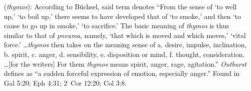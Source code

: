 \item[Outburst,]

(\textit{thymos}):
According to Büchsel, said term denotes ``From the sense of `to well up,' `to boil up,' there seems to have developed that of `to smoke,' and then `to cause to go up in smoke,' `to sacrifice.' The basic meaning of \emph{thymos} is thus similar to that of \emph{pneuma}, namely, `that which is moved and which moves,' `vital force.' \ldots \emph{thymos} then takes on the meaning sense of a. desire, impulse, inclination, b. spirit, c. anger, d. sensibility, e. disposition or mind, f. thought, consideration. \ldots [for the writers] For them \emph{thymos} means spirit, anger, rage, agitation.'' 
\emph{Outburst} defines as ``a sudden forceful expression of emotion, especially anger.''
Found in Gal 5:20; Eph 4:31; 2~Cor 12:20; Col 3:8.
